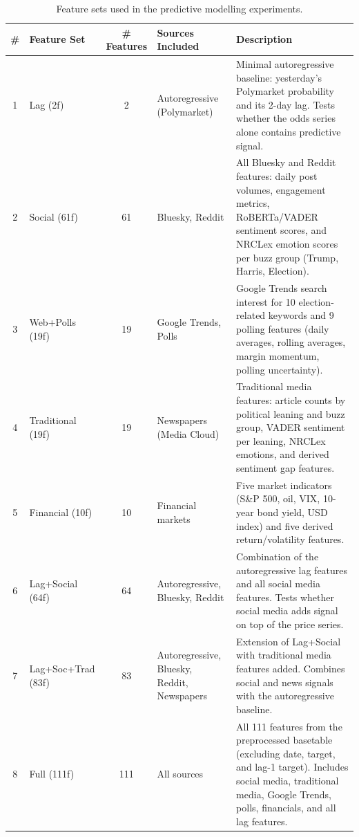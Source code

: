 \begin{table}[H]
\centering
\caption{Feature sets used in the predictive modelling experiments.}
\label{tab:feature_sets}
\small
\begin{tabular}{>{\color{white}}c >{\color{white}}p{2.5cm} >{\color{white}}c >{\color{white}}p{3cm} >{\color{white}}p{5.5cm}}
\toprule
\textbf{\#} & \textbf{Feature Set} & \textbf{\# Features} & \textbf{Sources Included} & \textbf{Description} \\
\midrule
1 & Lag (2f) & 2 & Autoregressive (Polymarket) & Minimal autoregressive baseline: yesterday's Polymarket probability and its 2-day lag. Tests whether the odds series alone contains predictive signal. \\[3pt]
2 & Social (61f) & 61 & Bluesky, Reddit & All Bluesky and Reddit features: daily post volumes, engagement metrics, RoBERTa/VADER sentiment scores, and NRCLex emotion scores per buzz group (Trump, Harris, Election). \\[3pt]
3 & Web+Polls (19f) & 19 & Google Trends, Polls & Google Trends search interest for 10 election-related keywords and 9 polling features (daily averages, rolling averages, margin momentum, polling uncertainty). \\[3pt]
4 & Traditional (19f) & 19 & Newspapers (Media Cloud) & Traditional media features: article counts by political leaning and buzz group, VADER sentiment per leaning, NRCLex emotions, and derived sentiment gap features. \\[3pt]
5 & Financial (10f) & 10 & Financial markets & Five market indicators (S\&P 500, oil, VIX, 10-year bond yield, USD index) and five derived return/volatility features. \\[3pt]
6 & Lag+Social (64f) & 64 & Autoregressive, Bluesky, Reddit & Combination of the autoregressive lag features and all social media features. Tests whether social media adds signal on top of the price series. \\[3pt]
7 & Lag+Soc+Trad (83f) & 83 & Autoregressive, Bluesky, Reddit, Newspapers & Extension of Lag+Social with traditional media features added. Combines social and news signals with the autoregressive baseline. \\[3pt]
8 & Full (111f) & 111 & All sources & All 111 features from the preprocessed basetable (excluding date, target, and lag-1 target). Includes social media, traditional media, Google Trends, polls, financials, and all lag features. \\[3pt]
\bottomrule
\end{tabular}
\end{table}

